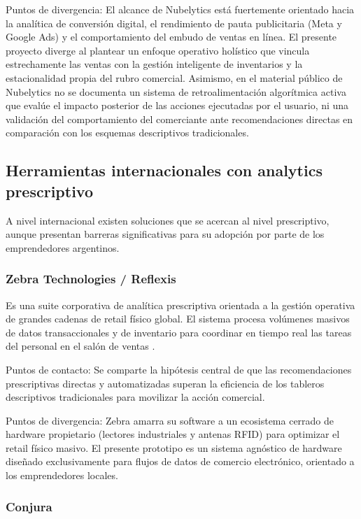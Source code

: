 Puntos de divergencia: El alcance de Nubelytics está fuertemente orientado hacia la analítica de conversión digital, el rendimiento de pauta publicitaria (Meta y Google Ads) y el comportamiento del embudo de ventas en línea. El presente proyecto diverge al plantear un enfoque operativo holístico que vincula estrechamente las ventas con la gestión inteligente de inventarios y la estacionalidad propia del rubro comercial. Asimismo, en el material público de Nubelytics no se documenta un sistema de retroalimentación algorítmica activa que evalúe el impacto posterior de las acciones ejecutadas por el usuario, ni una validación del comportamiento del comerciante ante recomendaciones directas en comparación con los esquemas descriptivos tradicionales.

\subsection{Herramientas internacionales con analytics prescriptivo}
\label{sec:herramientas-internacionales}

A nivel internacional existen soluciones que se acercan al nivel prescriptivo, aunque presentan barreras significativas para su adopción por parte de los emprendedores argentinos.

\subsubsection{Zebra Technologies / Reflexis}
\label{sec:zebra}

Es una suite corporativa de analítica prescriptiva orientada a la gestión operativa de grandes cadenas de retail físico global. El sistema procesa volúmenes masivos de datos transaccionales y de inventario para coordinar en tiempo real las tareas del personal en el salón de ventas \parencite{ZebraReflexis2024}.

Puntos de contacto: Se comparte la hipótesis central de que las recomendaciones prescriptivas directas y automatizadas superan la eficiencia de los tableros descriptivos tradicionales para movilizar la acción comercial.

Puntos de divergencia: Zebra amarra su software a un ecosistema cerrado de hardware propietario (lectores industriales y antenas RFID) para optimizar el retail físico masivo. El presente prototipo es un sistema agnóstico de hardware diseñado exclusivamente para flujos de datos de comercio electrónico, orientado a los emprendedores locales.

\subsubsection{Conjura}
\label{sec:conjura}

